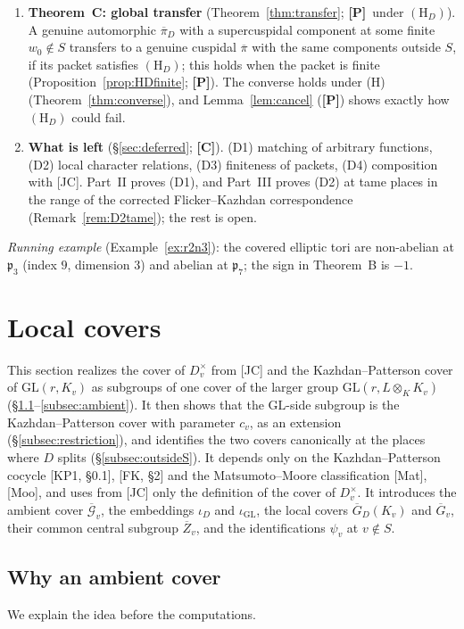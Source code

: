 \documentclass[12pt]{article}
\newcommand{\ov}[1]{\overline{#1}}
\newcommand{\GL}{\mathrm{GL}}
\newcommand{\Gb}{\ov{G}}
\newcommand{\Zb}{\ov{Z}}
\newcommand{\GDb}{\ov{G}_D}
\newcommand{\pib}{\ov{\pi}}
\newcommand{\cGb}{\ov{\mathcal{G}}}
\newcommand{\iD}{\iota_D}
\newcommand{\iG}{\iota_{\GL}}
\newcommand{\Pv}{\textbf{[P]}}
\newcommand{\Cv}{\textbf{[C]}}
\theoremstyle{plain}
\theoremstyle{definition}
\begin{document}
\begin{enumerate}[leftmargin=*,label=\arabic*.]
\item \textbf{Theorem~C: global transfer} (Theorem~\ref{thm:transfer}; \Pv\ under $(\mathrm H_D)$). A genuine automorphic $\pib_D$ with a supercuspidal component at some finite $w_0\notin S$ transfers to a genuine cuspidal $\pib$ with the same components outside $S$, if its packet satisfies $(\mathrm H_D)$; this holds when the packet is finite (Proposition~\ref{prop:HDfinite}; \Pv). The converse holds under (H) (Theorem~\ref{thm:converse}), and Lemma~\ref{lem:cancel} (\Pv) shows exactly how $(\mathrm H_D)$ could fail.
\item \textbf{What is left} (\S\ref{sec:deferred}; \Cv). (D1) matching of arbitrary functions, (D2) local character relations, (D3) finiteness of packets, (D4) composition with [JC]. Part~II proves (D1), and Part~III proves (D2) at tame places in the range of the corrected Flicker--Kazhdan correspondence (Remark~\ref{rem:D2tame}); the rest is open.
\end{enumerate}
\emph{Running example} (Example~\ref{ex:r2n3}): the covered elliptic tori are non-abelian at $\mathfrak p_3$ (index $9$, dimension $3$) and abelian at $\mathfrak p_7$; the sign in Theorem~B is $-1$.

\section{Local covers}\label{sec:covers}
This section realizes the cover of $D_v^\times$ from [JC] and the Kazhdan--Patterson cover of $\GL(r,K_v)$ as subgroups of one cover of the larger group $\GL(r,L\otimes_KK_v)$ (\S\ref{subsec:why}--\ref{subsec:ambient}). It then shows that the $\GL$-side subgroup is the Kazhdan--Patterson cover with parameter $c_v$, as an extension (\S\ref{subsec:restriction}), and identifies the two covers canonically at the places where $D$ splits (\S\ref{subsec:outsideS}). It depends only on the Kazhdan--Patterson cocycle [KP1, \S0.1], [FK, \S2] and the Matsumoto--Moore classification [Mat], [Moo], and uses from [JC] only the definition of the cover of $D_v^\times$. It introduces the ambient cover $\cGb_v$, the embeddings $\iD$ and $\iG$, the local covers $\GDb(K_v)$ and $\Gb_v$, their common central subgroup $\Zb_v$, and the identifications $\psi_v$ at $v\notin S$.

\subsection{Why an ambient cover}\label{subsec:why}
We explain the idea before the computations.
\end{document}
